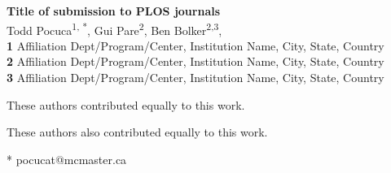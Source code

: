 \documentclass[10pt,letterpaper]{article}
\begin{document}
\vspace*{0.2in}

\begin{flushleft}
{\Large
\textbf{Title of submission to PLOS journals} %
}
\newline
\\
Todd Pocuca\textsuperscript{1, *},
Gui Pare\textsuperscript{2\Yinyang},
Ben Bolker\textsuperscript{2,3\textcurrency},
\\
\bigskip
\textbf{1} Affiliation Dept/Program/Center, Institution Name, City, State, Country
\\
\textbf{2} Affiliation Dept/Program/Center, Institution Name, City, State, Country
\\
\textbf{3} Affiliation Dept/Program/Center, Institution Name, City, State, Country
\\
\bigskip

% 
%
\Yinyang These authors contributed equally to this work.

\ddag These authors also contributed equally to this work.


* pocucat@mcmaster.ca

\end{flushleft}


%
\end{document}
